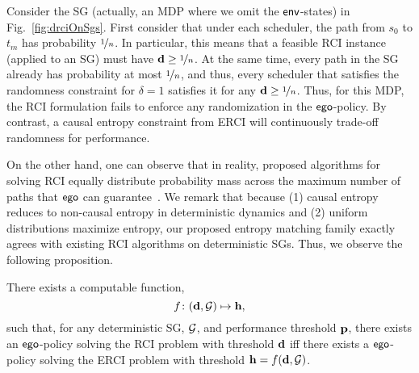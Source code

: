 \begin{example}
  Consider the SG (actually, an MDP where we omit the $\mathsf{env}$-states) in Fig.~\ref{fig:drciOnSgs}.
  First consider that under each scheduler, the path from $s_0$ to
  $t_m$ has probability $\nicefrac{1}{n}$. In particular, this means
  that a feasible RCI instance (applied to an SG) must have
  $\mathbf{d} \geq \nicefrac{1}{n}$. At the same time, every path in
  the SG already has probability at most $\nicefrac{1}{n}$, and thus,
  every scheduler that satisfies the randomness constraint for
  $\delta = 1$ satisfies it for any
  $\mathbf{d} \geq \nicefrac{1}{n}$. Thus, for this MDP, the RCI formulation fails to 
  enforce any randomization in the $\mathsf{ego}$-policy. By contrast, a
  causal entropy constraint from ERCI will continuously trade-off randomness
  for performance.
\end{example}



On the other hand, one can observe that in reality, proposed
algorithms for solving RCI equally distribute probability mass across
the maximum number of paths that $\mathsf{ego}$ can
guarantee~\cite{DBLP:conf/cav/FremontS18}. We remark that because (1)
causal entropy reduces to non-causal entropy in deterministic dynamics
and (2) uniform distributions maximize entropy, our proposed entropy
matching family exactly agrees with existing RCI algorithms on
deterministic SGs. Thus, we observe the following proposition.
\begin{proposition}\label{prop:conservative}
  There exists a computable function,
  \[f \colon (\mathbf{d}, \mathcal{G}) \mapsto \mathbf{h},\] such that, for any
  deterministic SG, $\mathcal{G}$, and performance threshold $\mathbf{p}$,
  there exists an $\mathsf{ego}$-policy solving the RCI problem with
  threshold $\mathbf{d}$ iff there exists a $\mathsf{ego}$-policy solving
  the ERCI problem with threshold
  $\mathbf{h} = f(\mathbf{d}, \mathcal{G})$.
\end{proposition}

